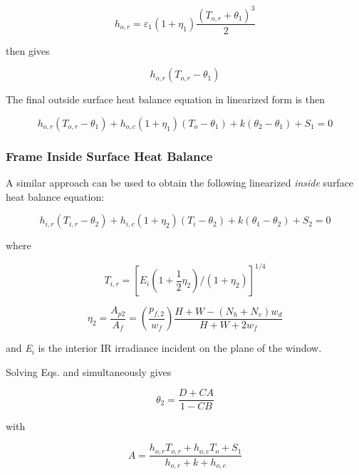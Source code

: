 \begin{equation}
{h_{o,r}} = {\varepsilon_1}(1 + {\eta_1})\frac{{{{({T_{o,r}} + {\theta_1})}^3}}}{2}
\end{equation}

then gives

\begin{equation}
{h_{o,r}}({T_{o,r}} - {\theta_1})
\end{equation}

The final outside surface heat balance equation in linearized form is then

\begin{equation}
{h_{o,r}}({T_{o,r}} - {\theta_1}) + {h_{o,c}}(1 + {\eta_1})({T_o} - {\theta_1}) + k({\theta_2} - {\theta_1}) + {S_1} = 0
\end{equation}

\subsubsection{Frame Inside Surface Heat Balance}\label{frame-inside-surface-heat-balance}

A similar approach can be used to obtain the following linearized \emph{inside} surface heat balance equation:

\begin{equation}
{h_{i,r}}({T_{i,r}} - {\theta_2}) + {h_{i,c}}(1 + {\eta_2})({T_i} - {\theta_2}) + k({\theta_1} - {\theta_2}) + {S_2} = 0
\end{equation}

where

\begin{equation}
{T_{i,r}} = {[{E_i}(1 + \frac{1}{2}{\eta_2})/(1 + {\eta_2})]^{1/4}}
\end{equation}

\begin{equation}
{\eta_2} = \frac{{{A_{p2}}}}{{{A_f}}} = \left( {\frac{{{p_{f,2}}}}{{{w_f}}}} \right)\frac{{H + W - ({N_h} + {N_v}){w_d}}}{{H + W + 2{w_f}}}
\end{equation}

and \emph{E\(_{i}\)} is the interior IR irradiance incident on the plane of the window.

Solving Eqs. and simultaneously gives

\begin{equation}
{\theta_2} = \frac{{D + CA}}{{1 - CB}}
\end{equation}

with

\begin{equation}
A = \frac{{{h_{o,r}}{T_{o,r}} + {h_{o,c}}{T_o} + {S_1}}}{{{h_{o,r}} + k + {h_{o,c}}}}
\end{equation}

